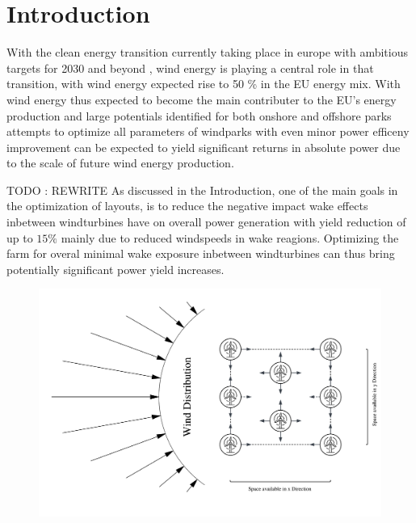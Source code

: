 
\chapter{Introduction}\label{chapter:introduction}


With the clean energy transition currently taking place in europe with ambitious targets for 2030 and beyond \cite{EU_RE_Targets_2023} , wind energy is playing a central role in that transition, with wind energy expected rise to 50 \% in the EU energy mix. \cite{ConsiliumEU_Harnessing_Wind_Power_2024}
With wind energy thus expected to become the main contributer to the EU's energy production and large potentials identified for both onshore and offshore parks \cite{EEA_Wind_Energy_Potential_2009} attempts to optimize all parameters of windparks with even minor power efficeny improvement can be expected to yield significant returns in absolute power due to the scale of future wind energy production. 


TODO : REWRITE 
As discussed in the Introduction, one of the main goals in the optimization of layouts, is to reduce the negative impact wake effects inbetween windturbines have on overall power generation with yield reduction of up to $15 \%$  mainly due to reduced windspeeds in wake reagions. Optimizing the farm for overal minimal wake exposure inbetween windturbines can thus bring potentially significant power yield increases. \cite{hou_review_2019} \cite{KIM2024123383}


\begin{figure}[h] 
	\centering
	\includegraphics[width=1\textwidth]{figures/introduction/intro_plot.png} 
	\caption{}
	\label{fig:intro_plot}
\end{figure}


